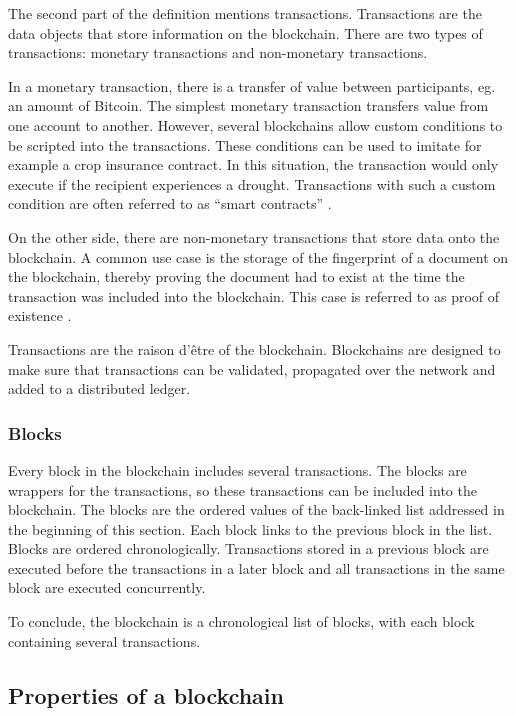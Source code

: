 The second part of the definition mentions transactions. Transactions are the data objects that store information on the blockchain. There are two types of transactions: monetary transactions and non-monetary transactions.

In a monetary transaction, there is a transfer of value between participants, eg. an amount of Bitcoin. The simplest monetary transaction transfers value from one account to another. However, several blockchains allow custom conditions to be scripted into the transactions. These conditions can be used to imitate for example a crop insurance contract. In this situation, the transaction would only execute if the recipient experiences a drought. Transactions with such a custom condition are often referred to as ``smart contracts'' \cite{Ethereum-whitepaper}.

On the other side, there are non-monetary transactions that store data onto the blockchain. A common use case is the storage of the fingerprint of a document on the blockchain, thereby proving the document had to exist at the time the transaction was included into the blockchain. This case is referred to as proof of existence \cite{proof-of-existence}.

Transactions are the raison d'\^{e}tre of the blockchain. Blockchains are designed to make sure that transactions can be validated, propagated over the network and added to a distributed ledger.

\subsubsection{Blocks}

Every block in the blockchain includes several transactions. The blocks are wrappers for the transactions, so these transactions can be included into the blockchain. The blocks are the ordered values of the back-linked list addressed in the beginning of this section. Each block links to the previous block in the list. Blocks are ordered chronologically. Transactions stored in a previous block are executed before the transactions in a later block and all transactions in the same block are executed concurrently.

To conclude, the blockchain is a chronological list of blocks, with each block containing several transactions.

\subsection{Properties of a blockchain}

